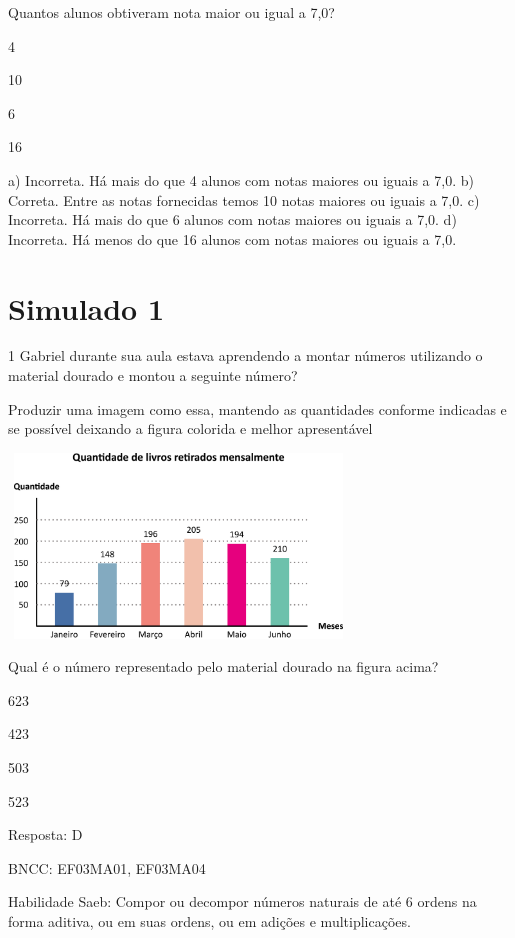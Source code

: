 \begin{escolha}
{\begin{escolha}
{Quantos alunos obtiveram nota maior ou igual a 7,0?

\begin{escolha}
\item
  4
\item
  10
\item
  6
\item
  16
\end{escolha}

a) Incorreta. Há mais do que 4 alunos com notas maiores ou iguais a 7,0.
b) Correta. Entre as notas fornecidas temos 10 notas maiores ou iguais a 7,0.
c) Incorreta. Há mais do que 6 alunos com notas maiores ou iguais a 7,0.
d) Incorreta. Há menos do que 16 alunos com notas maiores ou iguais a 7,0.


\chapter{Simulado 1}

\num{1} Gabriel durante sua aula estava aprendendo a montar números utilizando o
material dourado e montou a seguinte número?

Produzir uma imagem como essa, mantendo as quantidades conforme
indicadas e se possível deixando a figura colorida e melhor apresentável

\includegraphics[width=3.55128in,height=1.93600in]{media/image106.png}

Qual é o número representado pelo material dourado na figura acima?

\begin{escolha}
\item
  623
\item
  423
\item
  503
\item
  523
\end{escolha}

Resposta: D

BNCC: EF03MA01, EF03MA04

Habilidade Saeb: Compor ou decompor números naturais de até 6 ordens na
forma aditiva, ou em suas ordens, ou em adições e multiplicações.

}
\end{escolha}}
\end{escolha}
